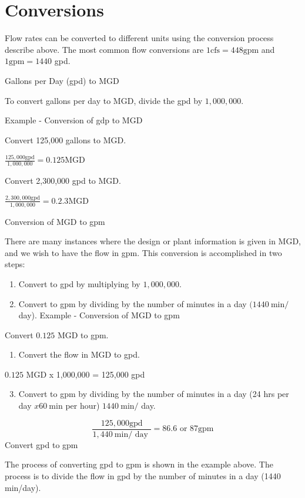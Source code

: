 \documentclass[10pt]{article}
\begin{document}
\section{Conversions}
Flow rates can be converted to different units using the conversion process describe above. The most common flow conversions are $1 \mathrm{cfs}=448 \mathrm{gpm}$ and $1 \mathrm{gpm}=1440$ gpd.

Gallons per Day (gpd) to MGD

To convert gallons per day to MGD, divide the gpd by $1,000,000$.

Example - Conversion of gdp to MGD

Convert 125,000 gallons to MGD.

$\frac{125,000 \mathrm{gpd}}{1,000,000}=0.125 \mathrm{MGD}$

Convert 2,300,000 gpd to MGD.

$\frac{2,300,000 \mathrm{gpd}}{1,000,000}=0.2 .3 \mathrm{MGD}$

Conversion of MGD to gpm

There are many instances where the design or plant information is given in MGD, and we wish to have the flow in gpm. This conversion is accomplished in two steps:

\begin{enumerate}
  \item Convert to gpd by multiplying by $1,000,000$.

  \item Convert to gpm by dividing by the number of minutes in a day $(1440 \mathrm{~min} /$ day). Example - Conversion of MGD to gpm

\end{enumerate}
Convert $0.125$ MGD to gpm.

\begin{enumerate}
  \item Convert the flow in MGD to gpd.
\end{enumerate}
$0.125$ MGD x 1,000,000 = 125,000 gpd

\begin{enumerate}
  \setcounter{enumi}{2}
  \item Convert to gpm by dividing by the number of minutes in a day (24 hrs per day $x 60 \mathrm{~min}$ per hour) $1440 \mathrm{~min} /$ day.
\end{enumerate}
$$
\frac{125,000 \mathrm{gpd}}{1,440 \mathrm{~min} / \text { day }}=86.6 \text { or } 87 \mathrm{gpm}
$$
Convert gpd to gpm

The process of converting gpd to gpm is shown in the example above. The process is to divide the flow in gpd by the number of minutes in a day (1440 min/day).
\end{document}
